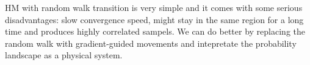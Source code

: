 











HM with random walk transition is very simple and it comes with some serious disadvantages:
slow convergence speed, might stay in the same region for a long time and produces highly correlated sampels. 
We can do better by replacing the random walk with gradient-guided movements and intepretate the probability
landscape as a physical system.


